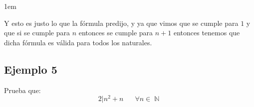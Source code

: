 \documentclass[12pt, fleqn]{report}                             %
\newenvironment{SmallIndentation}[1][0.75em]                    %
        {\begin{adjustwidth}{#1}{}\begin{footnotesize}}             %
        {\end{footnotesize}\end{adjustwidth}}                       %
\DeclareMathOperator \Space     {\quad}                         %
\theoremstyle{break}                                            %
\DeclareMathOperator \Naturals     {\mathbb{N}}                 %
\begin{document}
\begin{SmallIndentation}[1em]
\begin{itemize}
                        Y esto es justo lo que la fórmula predijo, y ya que vimos que se cumple
                        para $1$ y que si se cumple para $n$ entonces se cumple para $n+1$ entonces
                        tenemos que dicha fórmula es válida para todos los naturales.
                        
                    \end{itemize}

                    

                \end{SmallIndentation}


            \clearpage
            \subsection*{Ejemplo 5}

                Prueba que:
                \begin{equation*}
                    2 | n^2 + n 
                    \Space \forall n \in \Naturals 
                \end{equation*}
\end{document}
